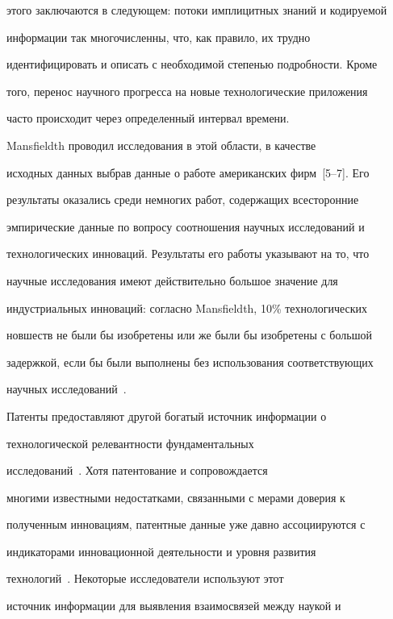 этого заключаются в следующем: потоки имплицитных знаний и кодируемой 


информации так многочисленны, что, как правило, их трудно 


идентифицировать и описать с необходимой степенью подробности. Кроме 


того, перенос научного прогресса на новые технологические приложения 


часто происходит через определенный интервал времени.


     


     Mansfieldth проводил исследования в этой области, в качестве 


исходных данных выбрав данные о работе американских фирм~[5--7]. Его 


результаты оказались среди немногих работ, содержащих всесторонние 


эмпирические данные по вопросу соотношения научных исследований и 


технологических инноваций. Результаты его работы указывают на то, что 


научные исследования имеют действительно большое значение для 


индустриальных инноваций: согласно Mansfieldth, 10\% технологических 


новшеств не были бы изобретены или же были бы изобретены с большой 


задержкой, если бы были выполнены без использования соответствующих 


научных исследований~\cite{5-koz, 6-koz}.


     


     Патенты предоставляют другой богатый источник информации о 


технологической релевантности фундаментальных 


     исследований~\cite{2-koz}. Хотя патентование и сопровождается 


многими известными недостатками, связанными с мерами доверия к 


полученным инновациям, патентные данные уже давно ассоциируются с 


индикаторами инновационной деятельности и уровня развития 


технологий~\cite{2-koz, 3-koz}. Некоторые исследователи используют этот 


источник информации для выявления взаимосвязей между наукой и 


